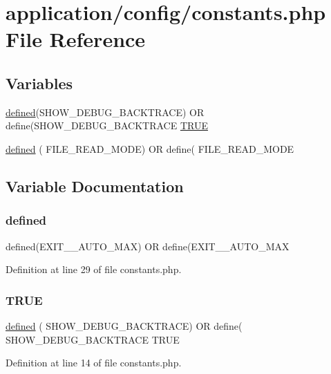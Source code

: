 \hypertarget{constants_8php}{}\section{application/config/constants.php File Reference}
\label{constants_8php}
\subsection*{Variables}
\begin{DoxyCompactItemize}
\item 
\mbox{\hyperlink{password_8php_a74f41c0efe4435fb8ac2133464d3cd57}{defined}}(\textquotesingle{}S\+H\+O\+W\+\_\+\+D\+E\+B\+U\+G\+\_\+\+B\+A\+C\+K\+T\+R\+A\+CE\textquotesingle{}) OR define(\textquotesingle{}S\+H\+O\+W\+\_\+\+D\+E\+B\+U\+G\+\_\+\+B\+A\+C\+K\+T\+R\+A\+CE\textquotesingle{} \mbox{\hyperlink{constants_8php_ae04a3efe6aa42044f803ee90c2277846}{T\+R\+UE}}
\item 
\mbox{\hyperlink{constants_8php_acf67d074d9db42fcec0e958fd8223165}{defined}} ( \textquotesingle{}F\+I\+L\+E\+\_\+\+R\+E\+A\+D\+\_\+\+M\+O\+DE\textquotesingle{}) OR define( \textquotesingle{}F\+I\+L\+E\+\_\+\+R\+E\+A\+D\+\_\+\+M\+O\+DE\textquotesingle{}
\end{DoxyCompactItemize}


\subsection{Variable Documentation}
\mbox{\label{constants_8php_acf67d074d9db42fcec0e958fd8223165}} 
\subsubsection{\texorpdfstring{defined}{defined}}
{\footnotesize\ttfamily defined(\textquotesingle{}E\+X\+I\+T\+\_\+\+\_\+\+A\+U\+T\+O\+\_\+\+M\+AX\textquotesingle{}) OR define(\textquotesingle{}E\+X\+I\+T\+\_\+\+\_\+\+A\+U\+T\+O\+\_\+\+M\+AX\textquotesingle{}}



Definition at line 29 of file constants.\+php.

\mbox{\label{constants_8php_ae04a3efe6aa42044f803ee90c2277846}} 
\subsubsection{\texorpdfstring{TRUE}{TRUE}}
{\footnotesize\ttfamily \mbox{\hyperlink{password_8php_a74f41c0efe4435fb8ac2133464d3cd57}{defined}} ( \textquotesingle{}S\+H\+O\+W\+\_\+\+D\+E\+B\+U\+G\+\_\+\+B\+A\+C\+K\+T\+R\+A\+CE\textquotesingle{}) OR define( \textquotesingle{}S\+H\+O\+W\+\_\+\+D\+E\+B\+U\+G\+\_\+\+B\+A\+C\+K\+T\+R\+A\+CE\textquotesingle{} T\+R\+UE}



Definition at line 14 of file constants.\+php.

